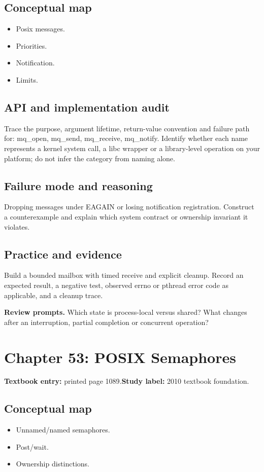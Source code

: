\documentclass[11pt,letterpaper,oneside]{report}
\begin{document}
\subsection{Conceptual map}
\begin{itemize}
\item Posix messages.
\item Priorities.
\item Notification.
\item Limits.
\end{itemize}
\subsection{API and implementation audit}
Trace the purpose, argument lifetime, return-value convention and failure path for: mq\_open, mq\_send, mq\_receive, mq\_notify. Identify whether each name represents a kernel system call, a libc wrapper or a library-level operation on your platform; do not infer the category from naming alone.

\subsection{Failure mode and reasoning}
Dropping messages under EAGAIN or losing notification registration. Construct a counterexample and explain which system contract or ownership invariant it violates.

\subsection{Practice and evidence}
Build a bounded mailbox with timed receive and explicit cleanup. Record an expected result, a negative test, observed errno or pthread error code as applicable, and a cleanup trace.

\textbf{Review prompts.} Which state is process-local versus shared? What changes after an interruption, partial completion or concurrent operation?

\section{Chapter 53: POSIX Semaphores}
\textbf{Textbook entry:} printed page 1089.\quad \textbf{Study label:} 2010 textbook foundation.

\subsection{Conceptual map}
\begin{itemize}
\item Unnamed/named semaphores.
\item Post/wait.
\item Ownership distinctions.
\end{itemize}
\end{document}

